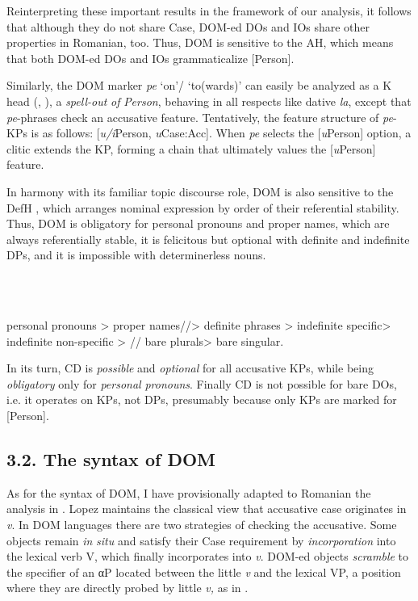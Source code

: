 \documentclass[output=paper,modfonts,nonflat]{langsci/langscibook}
\begin{document}
Reinterpreting these important results in the framework of our analysis, it follows that although they do not share Case, DOM-ed DOs and IOs share other properties in Romanian, too. Thus, DOM is sensitive to the AH, which means that both DOM-ed DOs and IOs grammaticalize [Person].

Similarly, the DOM marker \textit{pe} ‘on’/ ‘to(wards)’ can easily be analyzed as a K head (\citealt{Lopez2011}, \citealt{HillMardale2017}), a \textit{spell-out} \textit{of} \textit{Person}, behaving in all respects like dative \textit{la}, except that \textit{pe}{}-phrases check an accusative feature. Tentatively, the feature structure of \textit{pe}{}-KPs is as follows: [\textit{u/i}Person, \textit{u}Case:Acc]. When \textit{pe} selects the [\textit{u}Person] option, a clitic extends the KP, forming a chain that ultimately values the [\textit{u}Person] feature. 

In harmony with its familiar topic discourse role, DOM is also sensitive to the DefH , which arranges nominal expression by order of their referential stability. Thus, DOM is obligatory for personal pronouns and proper names, which are always referentially stable, it is felicitous but optional with definite and indefinite DPs, and it is impossible with determinerless nouns.

\ea%
    \label{ex:key:24}
    \gll\\
        \\
    \glt
    \z

          personal pronouns > proper names//> definite phrases > indefinite specific> indefinite non-specific > // bare plurals> bare singular.

In its turn, CD is \textit{possible} and \textit{optional} for all accusative KPs, while being \textit{obligatory} only for \textit{personal} \textit{pronouns}. Finally CD is not possible for bare DOs, i.e. it operates on KPs, not DPs, presumably because only KPs are marked for [Person].

\subsection{\textbf{3.2.} \textbf{The} \textbf{syntax} \textbf{of} \textbf{DOM}}

As for the syntax of DOM, I have provisionally adapted to Romanian the analysis in \citet{Lopez2011}. Lopez maintains the classical view that accusative case originates in \textit{v}. In DOM languages there are two strategies of checking the accusative. Some objects remain \textit{in} \textit{situ} and satisfy their Case requirement by \textit{incorporation} into the lexical verb V, which finally incorporates into \textit{v}. DOM-ed objects \textit{scramble} to the specifier of an αP located between the little \textit{v} and the lexical VP, a position where they are directly probed by little \textit{v,} as in .
\end{document}

